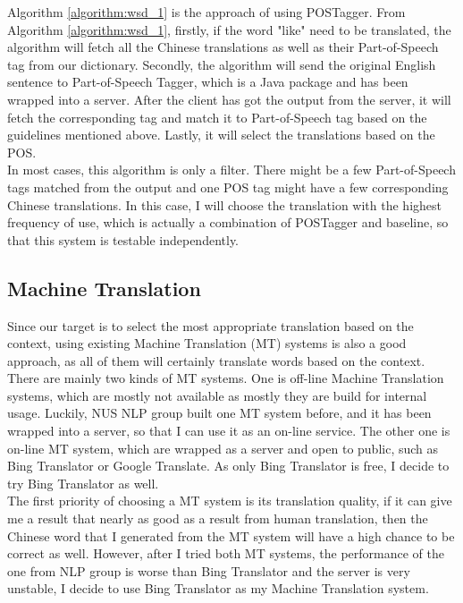 Algorithm \ref{algorithm:wsd_1} is the approach of using POSTagger. From Algorithm  \ref{algorithm:wsd_1}, firstly, if the word "like" need to be translated, the algorithm will fetch all the Chinese translations as well as their Part-of-Speech tag from our dictionary. Secondly, the algorithm will send the original English sentence to Part-of-Speech Tagger, which is a Java package and has been wrapped into a server. After the client has got the output from the server, it will fetch the corresponding tag and match it to Part-of-Speech tag based on the guidelines mentioned above. Lastly, it will select the translations based on the POS.
\\
In most cases, this algorithm is only a filter. There might be a few Part-of-Speech tags matched from the output and one POS tag might have a few corresponding Chinese translations. In this case, I will choose the translation with the highest frequency of use, which is actually a combination of POSTagger and baseline, so that this system is testable independently.


\subsection{Machine Translation}
Since our target is to select the most appropriate translation based on the context, using existing Machine Translation (MT) systems is also a good approach, as all of them will certainly translate words based on the context.
\\
There are mainly two kinds of MT systems. One is off-line Machine Translation systems, which are mostly not available as mostly they are build for internal usage. Luckily, NUS NLP group built one MT system before, and it has been wrapped into a server, so that I can use it as an on-line service. The other one is on-line MT system, which are wrapped as a server and open to public, such as Bing Translator or Google Translate. As only Bing Translator is free, I decide to try Bing Translator as well.
\\
The first priority of choosing a MT system is its translation quality, if it can give me a result that nearly as good as a result from human translation, then the Chinese word that I generated from the MT system will have a high chance to be correct as well. However, after I tried both MT systems, the performance of the one from NLP group is worse than Bing Translator and the server is very unstable, I decide to use Bing Translator as my Machine Translation system.
\\

